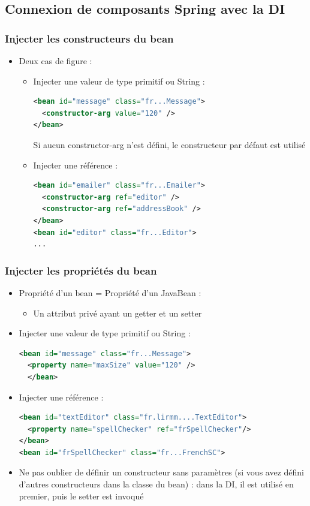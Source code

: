 \documentclass{beamer}
\begin{document}
\subsection{Connexion de composants Spring avec la DI}
\begin{frame}[fragile]
  \frametitle{Injecter les constructeurs du bean}
  \begin{itemize}
  \item Deux cas de figure :
    \begin{itemize}
    \item Injecter une valeur de type primitif ou String :
      
      \begin{lstlisting}[language=XML,basicstyle=\scriptsize]
<bean id="message" class="fr...Message">
  <constructor-arg value="120" />
</bean>
\end{lstlisting}
Si aucun constructor-arg n'est défini, le constructeur par défaut est
utilisé
\item Injecter une référence :
  \begin{lstlisting}[language=XML,basicstyle=\scriptsize]
<bean id="emailer" class="fr...Emailer">
  <constructor-arg ref="editor" />
  <constructor-arg ref="addressBook" />
</bean>
<bean id="editor" class="fr...Editor">
...
\end{lstlisting}
\end{itemize}
\end{itemize}
\end{frame}

\begin{frame}[fragile]
  \frametitle{Injecter les propriétés du bean}
  \begin{itemize}
  \item Propriété d'un bean = Propriété d'un JavaBean :
    \begin{itemize}
    \item Un attribut privé ayant un getter et un setter
    \end{itemize}
  \item Injecter une valeur de type primitif ou String :
  \begin{lstlisting}[language=XML,basicstyle=\scriptsize]    
<bean id="message" class="fr...Message">
  <property name="maxSize" value="120" />
  </bean>
\end{lstlisting}
\item Injecter une référence :
\begin{lstlisting}[language=XML,basicstyle=\scriptsize]
<bean id="textEditor" class="fr.lirmm....TextEditor">
  <property name="spellChecker" ref="frSpellChecker"/>
</bean>
<bean id="frSpellChecker" class="fr...FrenchSC">
\end{lstlisting}
\item Ne pas oublier de définir un constructeur sans paramètres (si
vous avez défini d'autres constructeurs dans la classe du bean) :
dans la DI, il est utilisé en premier, puis le setter est invoqué
\end{itemize}
\end{frame}
\end{document}
